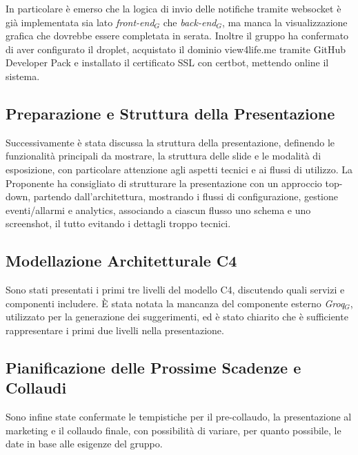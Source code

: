 \documentclass[10pt, letterpaper]{article}
\begin{document}
In particolare è emerso che la logica di invio delle notifiche tramite websocket è già implementata sia lato \textit{front-end$_G$} che \textit{back-end$_G$}, ma manca la visualizzazione grafica
che dovrebbe essere completata in serata.
Inoltre il gruppo ha confermato di aver configurato il droplet, acquistato il dominio view4life.me tramite GitHub Developer Pack e installato il certificato SSL con certbot, mettendo online il sistema.

\subsection*{Preparazione e Struttura della Presentazione}
Successivamente è stata discussa la struttura della presentazione, definendo le funzionalità principali da mostrare, la struttura delle slide e le modalità di esposizione, con particolare attenzione
agli aspetti tecnici e ai flussi di utilizzo. La Proponente ha consigliato di strutturare la presentazione con un approccio top-down, partendo dall'architettura, mostrando i flussi di configurazione,
gestione eventi/allarmi e analytics, associando a ciascun flusso uno schema e uno screenshot, il tutto evitando i dettagli troppo tecnici.

\subsection*{Modellazione Architetturale C4}
Sono stati presentati i primi tre livelli del modello C4, discutendo quali servizi e componenti includere. È stata notata la mancanza del componente esterno \textit{Groq$_G$}, utilizzato per la
generazione dei suggerimenti, ed è stato chiarito che è sufficiente rappresentare i primi due livelli nella presentazione.

\subsection*{Pianificazione delle Prossime Scadenze e Collaudi}
Sono infine state confermate le tempistiche per il pre-collaudo, la presentazione al marketing e il collaudo finale, con possibilità di variare, 
per quanto possibile, le date in base alle esigenze del gruppo.


\makeTodoTable
\end{document}
